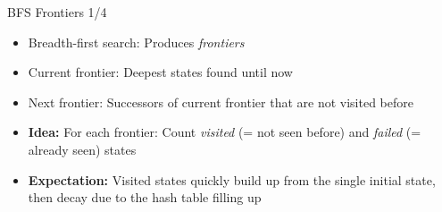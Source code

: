 \documentclass[aspectratio=169]{beamer}
\begin{document}
\begin{frame}{BFS Frontiers 1/4}
    \begin{itemize}
        \item<1-> Breadth-first search: Produces \emph{frontiers}
        \item<1-> Current frontier: Deepest states found until now
        \item<1-> Next frontier: Successors of current frontier that are not visited before
        \item<2-> \textbf{Idea:} For each frontier: Count \emph{visited} (= not seen before) and \emph{failed} (= already seen) states
        \item<2-> \textbf{Expectation:} Visited states quickly build up from the single initial state, then decay due to the hash table filling up
    \end{itemize}
\end{frame}
\end{document}
